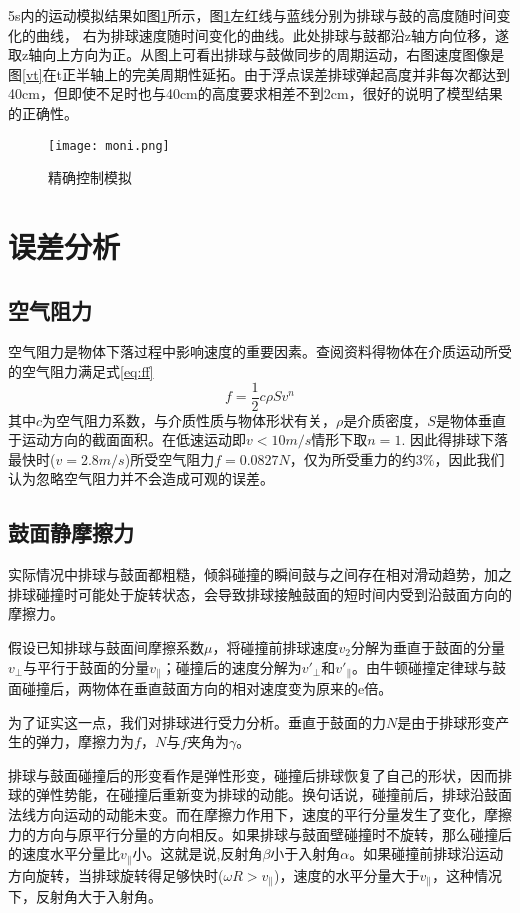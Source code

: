 \documentclass[withoutpreface,bwprint]{cumcmthesis} %
\begin{document}
5s内的运动模拟结果如图\ref{fig:moni}所示，图\ref{fig:moni}左红线与蓝线分别为排球与鼓的高度随时间变化的曲线，
右为排球速度随时间变化的曲线。此处排球与鼓都沿z轴方向位移，遂取z轴向上方向为正。从图上可看出排球与鼓做同步的周期运动，右图速度图像是图\ref{vt}在t正半轴上的完美周期性延拓。由于浮点误差排球弹起高度并非每次都达到40cm，但即使不足时也与40cm的高度要求相差不到2cm，很好的说明了模型结果的正确性。

\begin{figure}[h]
	\centering
	\texttt{[image: moni.png]}
	\caption{精确控制模拟}
	\label{fig:moni}
\end{figure}

\section{误差分析}

\subsection{空气阻力}
空气阻力是物体下落过程中影响速度的重要因素。查阅资料得物体在介质运动所受的空气阻力满足式\ref{eq:ff}
\begin{equation}
	f=\frac{1}{2}c\rho Sv^n
	\label{eq:ff}
\end{equation}
其中$c$为空气阻力系数，与介质性质与物体形状有关，$\rho$是介质密度，$S$是物体垂直于运动方向的截面面积。在低速运动即$v<10m/s$情形下取$n=1$. 因此得排球下落最快时($v=2.8m/s$)所受空气阻力$f=0.0827N$，仅为所受重力的约$3\%$，因此我们认为忽略空气阻力并不会造成可观的误差。

\subsection{鼓面静摩擦力}
实际情况中排球与鼓面都粗糙，倾斜碰撞的瞬间鼓与之间存在相对滑动趋势，加之排球碰撞时可能处于旋转状态，会导致排球接触鼓面的短时间内受到沿鼓面方向的摩擦力。

假设已知排球与鼓面间摩擦系数$\mu$，将碰撞前排球速度$v_2$分解为垂直于鼓面的分量$v_\bot$与平行于鼓面的分量$v_\parallel$；碰撞后的速度分解为$v'_\bot$和$v'_\parallel$。由牛顿碰撞定律球与鼓面碰撞后，两物体在垂直鼓面方向的相对速度变为原来的e倍。

为了证实这一点，我们对排球进行受力分析。垂直于鼓面的力$N$是由于排球形变产生的弹力，摩擦力为$f$，$N$与$f$夹角为$\gamma$。

排球与鼓面碰撞后的形变看作是弹性形变，碰撞后排球恢复了自己的形状，因而排球的弹性势能，在碰撞后重新变为排球的动能。换句话说，碰撞前后，排球沿鼓面法线方向运动的动能未变。而在摩擦力作用下，速度的平行分量发生了变化，摩擦力的方向与原平行分量的方向相反。如果排球与鼓面壁碰撞时不旋转，那么碰撞后的速度水平分量比$v_\parallel$小。这就是说,反射角$\beta$小于入射角$\alpha$。如果碰撞前排球沿运动方向旋转，当排球旋转得足够快时($\omega R>v_\parallel$)，速度的水平分量大于$v_\parallel$，这种情况下，反射角大于入射角。
\end{document}

